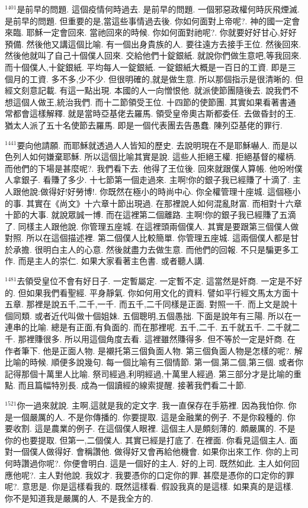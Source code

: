\documentclass{book}
\begin{document}
$^{1401}$是前早的問題.
這個疫情何時過去.
是前早的問題.
一個邪惡政權何時灰飛煙滅.
是前早的問題.
但重要的是,當這些事情過去後.
你如何面對上帝呢?.
神的國一定會來臨.
耶穌一定會回來.
當祂回來的時候.
你如何面對祂呢?.
你就要好好甘心,好好預備.
然後他又講這個比喻.
有一個出身貴族的人.
要往遠方去接手王位.
然後回來.
然後他就叫了自己十個僕人回來.
交給他們十錠銀紙.
就說你們做生意吧,等我回來.
而十個僕人,十錠銀紙.
平均每人一錠銀紙.
一錠銀紙大概是一百日的工資.
即是三個月的工資.
多不多,少不少.
但很明確的,就是做生意.
所以那個指示是很清晰的.
但經文刻意記載.
有這一點出現.
本國的人一向憎恨他.
就派使節團隨後去.
說我們不想這個人做王,統治我們.
而十二節領受王位.
十四節的使節團.
其實如果看著書通常都會這樣解釋.
就是當時亞基佬去羅馬.
領受皇帝奧古斯都委任.
去做昏封的王.
猶太人派了五十名使節去羅馬.
即是一個代表團去告愚蠢.
陳列亞基佬的罪行.

$^{1441}$要向他請願.
而耶穌就透過人人皆知的歷史.
去說明現在不是耶穌嚇人.
而是以色列人如何嫌棄耶穌.
所以這個比喻其實是說.
這些人拒絕王權.
拒絕基督的權柄.
而他們的下場是甚麼呢?.
我們看下去.
他得了王位後.
回來就跟僕人算帳.
他吩咐僕人拿銀子.
看賺了多少.
十七節第一個走過來.
主啊!你的銀子我已經賺了十滴了.
主人跟他說:做得好!好勞博!.
你既然在極小的時尚中心.
你全權管理十座城.
這個極小的事.
其實在《尚文》十六章十節出現過.
在那裡說人如何混亂財富.
而相對十六章十節的大事.
就說眾誠一博.
而在這裡第二個離路.
主啊!你的銀子我已經賺了五滴了.
同樣主人跟他說.
你管理五座城.
在這裡頭兩個僕人.
其實是要跟第三個僕人做對照.
所以在這個描述裡.
第二個僕人比較簡單.
你管理五座城.
這兩個僕人都是甘於承擔.
很明白主人的心意.
然後就盡力去做生意.
而他們的回報.
不只是騙更多工作.
而是主人的崇仁.
如果大家看著主色書.
或者聽人講.

$^{1481}$去領受皇位不會有好日子.
一定暫屬定.
一定暫不定.
這當然是奸商.
一定是不好的.
但如果我們看聖經.
平身靜氣.
你如何用文化的資料.
譬如平行經文馬太方面十五章.
那裡是說五千,二千,一千.
而五千,二千同樣是正面.
對照一千.
而上文是說十個同類.
或者近代叫做十個姐妹.
五個聰明,五個愚拙.
下面是說年有三陽.
所以在一連串的比喻.
總是有正面,有負面的.
而在那裡呢.
五千,二千.
五千就五千.
二千就二千.
那裡賺很多.
所以用這個角度去看.
這裡雖然賺得多.
但不等於一定是奸商.
在作者筆下.
他是正面人物.
是襯托第三個負面人物.
第三個負面人物是怎樣的呢?.
解比喻的時候.
順便多說幾句.
每一個比喻有三個情節.
第一個,第二個,第三個.
或者你記得那個十萬里人比喻.
祭司經過,利明經過,十萬里人經過.
第三部分才是比喻的重點.
而且篇幅特別長.
成為一個讀經的線索提醒.
接著我們看二十節.

$^{1521}$你一過來就說.
主啊,這就是我的定文字.
我一直保存在手筋裡.
因為我怕你.
你是一個嚴厲的人.
不是你傳播的.
你要提取.
這是金融業的例子.
不是你殺種的.
你要收割.
這是農業的例子.
在這個僕人眼裡.
這個主人是頗刻薄的.
頗嚴厲的.
不是你的也要提取.
但第一,二個僕人.
其實已經是打底了.
在裡面.
你看見這個主人.
面對一個僕人做得好.
會稱讚他.
做得好又會再給他機會.
如果你出來工作.
你的上司何時讚過你呢?.
你便會明白.
這是一個好的主人.
好的上司.
既然如此.
主人如何回應他呢?.
主人對他說.
我奴才.
我要憑你的口定你的罪.
甚麼是憑你的口定你的罪呢?.
意思是.
你是這樣看我的.
既然這樣看.
假設我真的是這樣.
如果真的是這樣.
你不是知道我是嚴厲的人.
不是我全方的.
\end{document}

